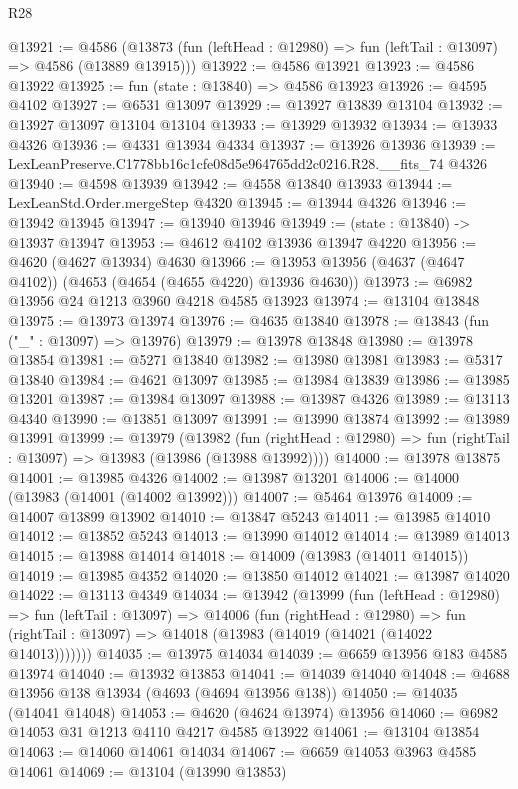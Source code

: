 \begin{lexlean}{R28}
\begin{coremodule}
@13921 := @4586
    (@13873 (fun (leftHead : @12980) => fun (leftTail : @13097) => @4586 (@13889 @13915)))
@13922 := @4586 @13921
@13923 := @4586 @13922
@13925 := fun (state : @13840) => @4586 @13923
@13926 := @4595 @4102
@13927 := @6531 @13097
@13929 := @13927 @13839 @13104
@13932 := @13927 @13097 @13104 @13104
@13933 := @13929 @13932
@13934 := @13933 @4326
@13936 := @4331 @13934 @4334
@13937 := @13926 @13936
@13939 := LexLeanPreserve.C1778bb16c1cfe08d5e964765dd2c0216.R28.__fits_74 @4326
@13940 := @4598 @13939
@13942 := @4558 @13840 @13933
@13944 := LexLeanStd.Order.mergeStep @4320
@13945 := @13944 @4326
@13946 := @13942 @13945
@13947 := @13940 @13946
@13949 := (state : @13840) -> @13937 @13947
@13953 := @4612 @4102 @13936 @13947 @4220
@13956 := @4620 (@4627 @13934) @4630
@13966 := @13953 @13956 (@4637 (@4647 @4102)) (@4653 (@4654 (@4655 @4220) @13936 @4630))
@13973 := @6982 @13956 @24 @1213 @3960 @4218 @4585 @13923
@13974 := @13104 @13848
@13975 := @13973 @13974
@13976 := @4635 @13840
@13978 := @13843 (fun ("_" : @13097) => @13976)
@13979 := @13978 @13848
@13980 := @13978 @13854
@13981 := @5271 @13840
@13982 := @13980 @13981
@13983 := @5317 @13840
@13984 := @4621 @13097
@13985 := @13984 @13839
@13986 := @13985 @13201
@13987 := @13984 @13097
@13988 := @13987 @4326
@13989 := @13113 @4340
@13990 := @13851 @13097
@13991 := @13990 @13874
@13992 := @13989 @13991
@13999 := @13979
    (@13982
      (fun (rightHead : @12980) => fun (rightTail : @13097) => @13983 (@13986 (@13988 @13992))))
@14000 := @13978 @13875
@14001 := @13985 @4326
@14002 := @13987 @13201
@14006 := @14000 (@13983 (@14001 (@14002 @13992)))
@14007 := @5464 @13976
@14009 := @14007 @13899 @13902
@14010 := @13847 @5243
@14011 := @13985 @14010
@14012 := @13852 @5243
@14013 := @13990 @14012
@14014 := @13989 @14013
@14015 := @13988 @14014
@14018 := @14009 (@13983 (@14011 @14015))
@14019 := @13985 @4352
@14020 := @13850 @14012
@14021 := @13987 @14020
@14022 := @13113 @4349
@14034 := @13942
    (@13999
      (fun (leftHead : @12980) =>
      fun (leftTail : @13097) =>
      @14006
        (fun (rightHead : @12980) =>
        fun (rightTail : @13097) => @14018 (@13983 (@14019 (@14021 (@14022 @14013)))))))
@14035 := @13975 @14034
@14039 := @6659 @13956 @183 @4585 @13974
@14040 := @13932 @13853
@14041 := @14039 @14040
@14048 := @4688 @13956 @138 @13934 (@4693 (@4694 @13956 @138))
@14050 := @14035 (@14041 @14048)
@14053 := @4620 (@4624 @13974) @13956
@14060 := @6982 @14053 @31 @1213 @4110 @4217 @4585 @13922
@14061 := @13104 @13854
@14063 := @14060 @14061 @14034
@14067 := @6659 @14053 @3963 @4585 @14061
@14069 := @13104 (@13990 @13853)

\end{coremodule}
\end{lexlean}
